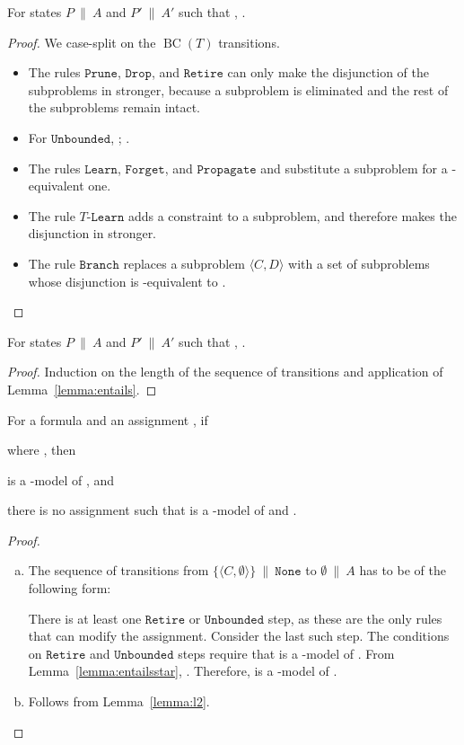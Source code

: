 \documentclass{llncs}
\newcommand\none[0]{\ensuremath{\mathtt{None}}}
\newcommand{\tr}[1]{\ensuremath{\mathtt{#1}}}
\newcommand{\ttr}[1]{\ensuremath{T\text{-}\mathtt{#1}}}
\newcommand{\state}[2]{\ensuremath{#1\ \|\ #2}}
\newcommand{\statenone}[1]{\state{#1}{\none}}
\newcommand{\subp}[2]{\ensuremath{\langle#1, #2\rangle}}
\newcommand{\setsp}[2]{\ensuremath{\{ \subp{#1}{#2} \}}}
\newcommand{\cd}{\subp{C}{D}}
\newcommand{\pa}{\state{P}{A}}
\newcommand{\paprime}{\state{P'}{A'}}
\newcommand{\bct}[0]{\ensuremath{\operatorname{BC}(T)}}
\begin{document}
\begin{lemma}
  \label{lemma:entails}
  For states {\pa} and {\paprime} such that ,
  .
\end{lemma}
\begin{proof}
  We case-split on the \bct{} transitions.
  \begin{itemize}
  \item The rules \tr{Prune}, \tr{Drop}, and \tr{Retire} can only make
    the disjunction of the subproblems in  stronger, because a
    subproblem is eliminated and the rest of the subproblems remain
    intact.
  \item For \tr{Unbounded}, ; .
  \item The rules \tr{Learn}, \tr{Forget}, and \tr{Propagate} and
    substitute a subproblem for a -equivalent one.
  \item The rule \ttr{Learn} adds a constraint to a subproblem, and
    therefore makes the disjunction in  stronger.
  \item The rule \tr{Branch} replaces a subproblem \cd{} with a set of
    subproblems whose disjunction is -equivalent to .
  \end{itemize}
\end{proof}

\begin{lemma}
  \label{lemma:entailsstar}
  For states {\pa} and {\paprime} such that ,
  .
\end{lemma}
\begin{proof}
  Induction on the length of the sequence of transitions and
  application of Lemma~\ref{lemma:entails}.
\end{proof}

\begin{theorem}
  \label{thm:sound-sat}
  For a formula  and an assignment , if
  
  where , then
  \begin{inparaenum}[(a)]
  \item  is a -model of , and
  \item there is no assignment  such that  is a -model of  and .
  \end{inparaenum}
\end{theorem}
\begin{proof}
  \begin{enumerate}[(a)]

  \item The sequence of transitions from
    \statenone{\setsp{C}{\emptyset}} to \state{\emptyset}{A} has to be
    of the following form:
    
    
    
    There is at least one \tr{Retire} or \tr{Unbounded} step, as these
    are the only rules that can modify the assignment. Consider the
    last such step. The conditions on \tr{Retire} and \tr{Unbounded}
    steps require that  is a -model of . From Lemma~\ref{lemma:entailsstar},
    . Therefore, 
    is a -model of . \vspace{6pt}

  \item Follows from Lemma~\ref{lemma:l2}.
  
  \end{enumerate}
\end{proof}
\end{document}
